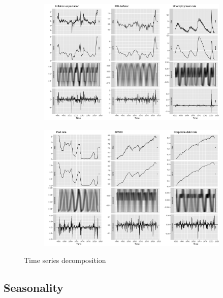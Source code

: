 \documentclass[hidelinks,12pts]{article}
\DeclareMathOperator{\1}{\mathbbm{1}}
\begin{document}
\begin{figure}[h!]
    \centering
    \begin{subfigure}[b]{0.8\textwidth}
        \centering
        \includegraphics[width=\textwidth]{IMAGES/decomposition_i.png}
        \caption*{}
    \end{subfigure}
    \hfill
    \begin{subfigure}[b]{0.8\textwidth}
        \centering
        \includegraphics[width=\textwidth]{IMAGES/decomposition_ii.png}
        \caption*{}
    \end{subfigure}
    \hfill 
    \caption{Time series decomposition}
    \label{fig:decomposition}
\end{figure}







    \subsection{Seasonality}

\end{document}
